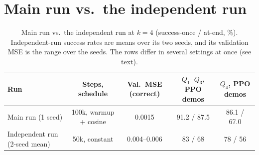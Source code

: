\section{Main run vs.\ the independent run}
\begin{table}[h]
\centering
\caption{Main run vs.\ the independent run at $k = 4$ (success-once / at-end, \%). Independent-run success rates are means over its
two seeds, and its validation MSE is the range over the seeds. The rows differ in several settings at once (see text).}
\label{tab:compare}
\footnotesize
\setlength{\tabcolsep}{4pt}
\begin{tabular}{lcccc}
\toprule
Run & Steps, schedule & Val.\ MSE (correct) & $Q_1$--$Q_3$, PPO demos & $Q_4$, PPO demos \\
\midrule
Main run (1 seed) & 100k, warmup + cosine & 0.0015 & 91.2 / 87.5 & 86.1 / 67.0 \\
Independent run (2-seed mean) & 50k, constant & 0.004--0.006 & 83 / 68 & 78 / 56 \\
\bottomrule
\end{tabular}
\end{table}
